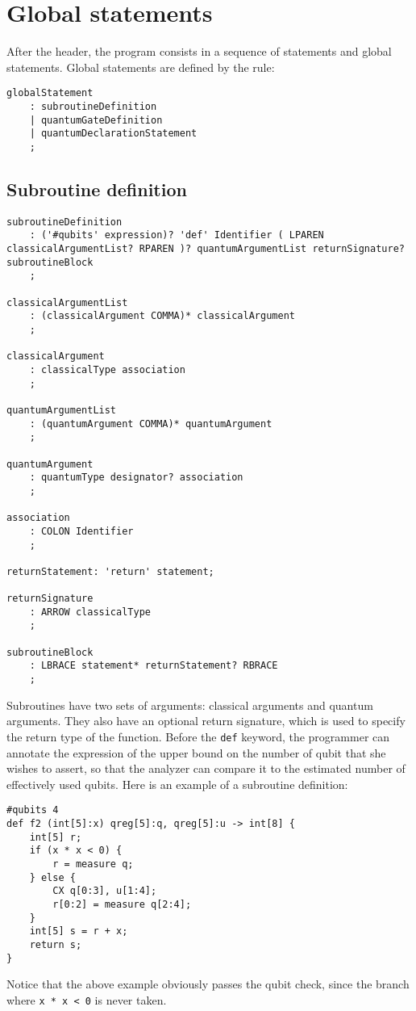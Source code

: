 \documentclass[12pt,a4paper]{report}
\theoremstyle{definition}
\theoremstyle{definition}
\theoremstyle{definition}
\begin{document}
\section{Global statements}
After the header, the program consists in a sequence of statements and global statements. Global statements are defined by the rule:
\begin{lstlisting}
globalStatement
    : subroutineDefinition
    | quantumGateDefinition
    | quantumDeclarationStatement
    ;
\end{lstlisting}



\subsection{Subroutine definition}
\begin{lstlisting}
subroutineDefinition
    : ('#qubits' expression)? 'def' Identifier ( LPAREN classicalArgumentList? RPAREN )? quantumArgumentList returnSignature? subroutineBlock
    ;

classicalArgumentList
    : (classicalArgument COMMA)* classicalArgument
    ;

classicalArgument
    : classicalType association
    ;

quantumArgumentList
    : (quantumArgument COMMA)* quantumArgument
    ;

quantumArgument
    : quantumType designator? association
    ;

association
    : COLON Identifier
    ;

returnStatement: 'return' statement;

returnSignature
    : ARROW classicalType
    ;

subroutineBlock
    : LBRACE statement* returnStatement? RBRACE
    ;
\end{lstlisting}

Subroutines have two sets of arguments: classical arguments and quantum arguments. They also have an optional return signature, which is used to specify the return type of the function.
Before the \texttt{def} keyword, the programmer can annotate the expression of the upper bound on the number of qubit that she wishes to assert, so that the analyzer can compare it to the estimated number of effectively used qubits.
Here is an example of a subroutine definition:
\begin{lstlisting}
#qubits 4
def f2 (int[5]:x) qreg[5]:q, qreg[5]:u -> int[8] {
    int[5] r;
    if (x * x < 0) {
        r = measure q;
    } else {
        CX q[0:3], u[1:4];
        r[0:2] = measure q[2:4];
    }
    int[5] s = r + x;
    return s;
}
\end{lstlisting}
Notice that the above example obviously passes the qubit check, since the branch where \texttt{x * x < 0} is never taken.
\end{document}
